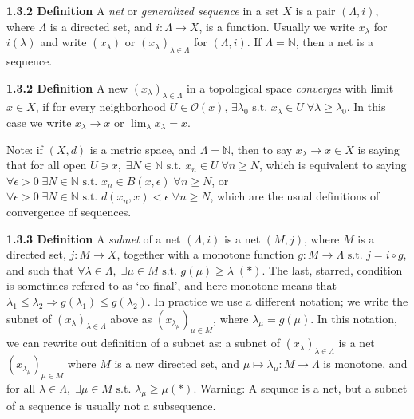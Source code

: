 \documentclass[12pt]{article}
\newcommand{\st}[0]{ \textrm{ s.t. } }
\newcommand{\rimply}[0] { \Rightarrow }
\newcommand{\rarw}[0] { \rightarrow }
\newcommand{\nats}[0] { \mathbb{N}}
\newcommand{\eps}[0] {  \epsilon }
\newcommand{\curlyO}[0] { \mathcal{O} }
\begin{document}
\begin{flushleft} {\bf 1.3.2 Definition} A \emph{net} or \emph{generalized sequence} in a set $X$ is a pair $(\Lambda, i)$, where $\Lambda$ is a directed set, and $i: \Lambda \rarw X$, is a function. Usually we write $x_\lambda$ for $i(\lambda)$ and write $(x_\lambda)$ or $(x_\lambda)_{\lambda \in \Lambda}$ for $(\Lambda, i)$. If $\Lambda = \nats$, then a net is a sequence.
\end{flushleft}

\begin{flushleft} {\bf 1.3.2 Definition} A new $(x_\lambda)_{\lambda \in \Lambda}$ in a topological space \emph{converges} with limit $x \in X$, if for every neighborhood $U \in \curlyO(x)$, $\exists \lambda_0 \st x_\lambda \in U \; \forall \lambda \ge \lambda_0$. In this case we write $x_\lambda \rarw x$ or $\lim_\lambda x_\lambda = x$.
\end{flushleft}

\begin{flushleft} Note: if $(X, d)$ is a metric space, and $\Lambda = \nats$, 
then to say $x_\lambda \rarw x \in X$ is saying that for all open 
$U \ni x, \; \exists N \in \nats \st x_n \in U \; \forall n \ge N$, which is equivalent to saying $\forall \eps > 0 \; \exists N \in \nats \st x_n \in B(x,\eps) \; \forall n \ge N$, or $\forall \eps > 0 \; \exists N \in \nats \st d(x_n, x) < \eps \; \forall n \ge N$, which are the usual definitions of convergence of sequences.
\end{flushleft}

\begin{flushleft} {\bf 1.3.3 Definition} A \emph{subnet} of a net $(\Lambda, i)$ is a net $(M, j)$, where $M$ is a directed set, $j: M \rarw X$, together with a  monotone function $g: M \rarw \Lambda \st j = i \circ g$, and such that $\forall \lambda \in \Lambda, \; \exists \mu \in M \st g(\mu) \ge \lambda \; (*)$. The last, starred, condition is sometimes refered to as `co final', and here monotone means that $\lambda_1 \le \lambda_2 \rimply g(\lambda_1) \le g(\lambda_2)$. In practice we use a different notation; we write the subnet of $(x_\lambda)_{\lambda \in \Lambda}$ above as $(x_{\lambda_\mu}) _{\mu \in M}$, where $\lambda_\mu = g(\mu)$. In this notation, we can rewrite out definition of a subnet as: a subnet of $(x_\lambda)_{\lambda \in \Lambda}$ is a net $(x_{\lambda_\mu})_{\mu \in M}$ where $M$ is a new directed set, and $\mu \mapsto \lambda_\mu: M \rarw \Lambda$ is monotone, and for all $\lambda \in \Lambda, \; \exists \mu \in M \st \lambda_\mu \ge \mu (*)$. Warning: A sequnce is a net, but a subnet of a sequence is usually not a subsequence.
\end{flushleft}
\end{document}
